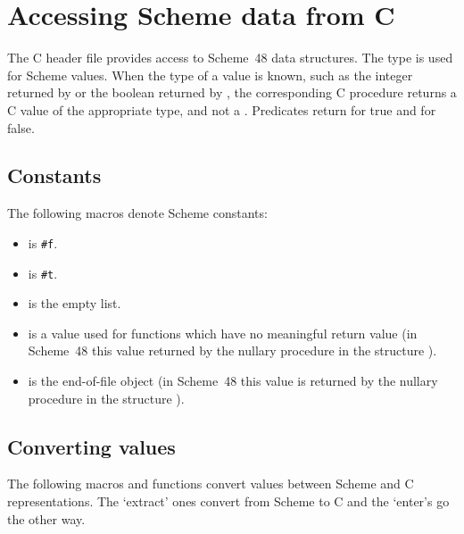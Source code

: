 \section{Accessing Scheme data from C}
\label{sec:scheme-data}

The C header file  provides
 access to Scheme~48 data structures.
The type  is used for Scheme values.
When the type of a value is known, such as the integer returned
 by  or the boolean returned by ,
 the corresponding C procedure returns a C value of the appropriate
 type, and not a .
Predicates return  for true and  for false.

\subsection{Constants}
\label{sec:constants}

The following macros denote Scheme constants:
%
\begin{itemize}
\item {} is \verb|#f|.
\item {} is \verb|#t|.
\item {} is the empty list.
\item {} is a value used for functions which have no
  meaningful return value
 (in Scheme~48 this value returned by the nullary procedure 
 in the structure ).
\item {} is the end-of-file object
 (in Scheme~48 this value is returned by the nullary procedure 
 in the structure ).
\end{itemize}

\subsection{Converting values}

The following macros and functions convert values between Scheme and C
 representations.
The `extract' ones convert from Scheme to C and the `enter's go the other
 way.

\begin{protos}
\end{protos}

